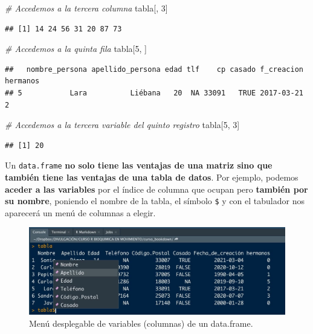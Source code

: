 \documentclass[11pt,]{book}
\newenvironment{Shaded}{\begin{snugshade}}{\end{snugshade}}
\newcommand{\CommentTok}[1]{\textcolor[rgb]{0.37,0.37,0.37}{\textit{#1}}}
\newcommand{\DecValTok}[1]{\textcolor[rgb]{0.06,0.06,0.06}{#1}}
\newcommand{\NormalTok}[1]{#1}
\begin{document}
\begin{Shaded}
\begin{Highlighting}[]
\CommentTok{# Accedemos a la tercera columna}
\NormalTok{tabla[, }\DecValTok{3}\NormalTok{]}
\end{Highlighting}
\end{Shaded}

\begin{verbatim}
## [1] 14 24 56 31 20 87 73
\end{verbatim}

\begin{Shaded}
\begin{Highlighting}[]
\CommentTok{# Accedemos a la quinta fila}
\NormalTok{tabla[}\DecValTok{5}\NormalTok{, ]}
\end{Highlighting}
\end{Shaded}

\begin{verbatim}
##   nombre_persona apellido_persona edad tlf    cp casado f_creacion hermanos
## 5           Lara          Liébana   20  NA 33091   TRUE 2017-03-21        2
\end{verbatim}

\begin{Shaded}
\begin{Highlighting}[]
\CommentTok{# Accedemos a la tercera variable del quinto registro}
\NormalTok{tabla[}\DecValTok{5}\NormalTok{, }\DecValTok{3}\NormalTok{]}
\end{Highlighting}
\end{Shaded}

\begin{verbatim}
## [1] 20
\end{verbatim}

Un \texttt{data.frame} \textbf{no solo tiene las ventajas de una matriz sino que también tiene las ventajas de una tabla de datos}. Por ejemplo, podemos \textbf{aceder a las variables} por el índice de columna que ocupan pero \textbf{también por su nombre}, poniendo el nombre de la tabla, el símbolo \texttt{\$} y con el tabulador nos aparecerá un menú de columnas a elegir.

\begin{figure}

{\centering \includegraphics[width=0.5\linewidth]{./img/tabla_dolar} 

}

\caption{Menú desplegable de variables (columnas) de un data.frame.}\label{fig:tabla-dolar}
\end{figure}
\end{document}
